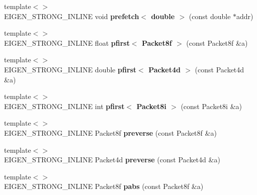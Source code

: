 \begin{DoxyCompactItemize}
\item 
\mbox{\label{namespace_eigen_1_1internal_afd9b32ea1210628e6993a912fb0f301c}} 
{\footnotesize template$<$$>$ }\\E\+I\+G\+E\+N\+\_\+\+S\+T\+R\+O\+N\+G\+\_\+\+I\+N\+L\+I\+NE void {\bfseries prefetch$<$ double $>$} (const double $\ast$addr)
\item 
\mbox{\label{namespace_eigen_1_1internal_a959b7e9370a1eacd8e495a68c170f85f}} 
{\footnotesize template$<$$>$ }\\E\+I\+G\+E\+N\+\_\+\+S\+T\+R\+O\+N\+G\+\_\+\+I\+N\+L\+I\+NE float {\bfseries pfirst$<$ Packet8f $>$} (const Packet8f \&a)
\item 
\mbox{\label{namespace_eigen_1_1internal_adb091f83beaed781dd66f50712cea44d}} 
{\footnotesize template$<$$>$ }\\E\+I\+G\+E\+N\+\_\+\+S\+T\+R\+O\+N\+G\+\_\+\+I\+N\+L\+I\+NE double {\bfseries pfirst$<$ Packet4d $>$} (const Packet4d \&a)
\item 
\mbox{\label{namespace_eigen_1_1internal_a41eb357c07324f65138ee5fb717bac13}} 
{\footnotesize template$<$$>$ }\\E\+I\+G\+E\+N\+\_\+\+S\+T\+R\+O\+N\+G\+\_\+\+I\+N\+L\+I\+NE int {\bfseries pfirst$<$ Packet8i $>$} (const Packet8i \&a)
\item 
\mbox{\label{namespace_eigen_1_1internal_ad9c27cc4d55785e56949b95e6e6faf84}} 
{\footnotesize template$<$$>$ }\\E\+I\+G\+E\+N\+\_\+\+S\+T\+R\+O\+N\+G\+\_\+\+I\+N\+L\+I\+NE Packet8f {\bfseries preverse} (const Packet8f \&a)
\item 
\mbox{\label{namespace_eigen_1_1internal_aeaf5a35f09f5a299f11c48b1c7a67ac2}} 
{\footnotesize template$<$$>$ }\\E\+I\+G\+E\+N\+\_\+\+S\+T\+R\+O\+N\+G\+\_\+\+I\+N\+L\+I\+NE Packet4d {\bfseries preverse} (const Packet4d \&a)
\item 
\mbox{\label{namespace_eigen_1_1internal_a5186f489cb92af2ef0b0d128792c62d4}} 
{\footnotesize template$<$$>$ }\\E\+I\+G\+E\+N\+\_\+\+S\+T\+R\+O\+N\+G\+\_\+\+I\+N\+L\+I\+NE Packet8f {\bfseries pabs} (const Packet8f \&a)

\end{DoxyCompactItemize}
